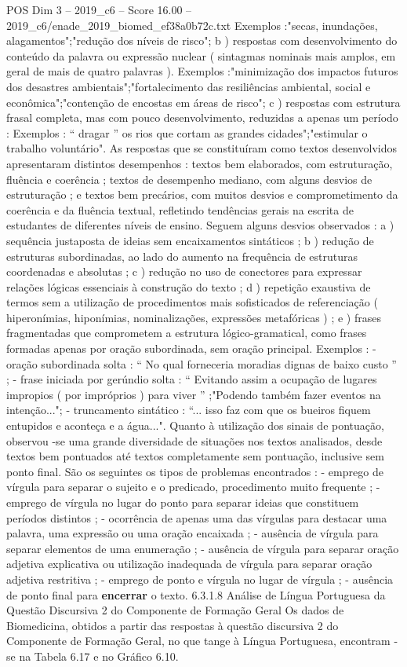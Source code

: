 \begin{textsample}{POS Dim 3 – 2019\_c6 – Score 16.00 – 2019\_c6/enade\_2019\_biomed\_ef38a0b72c.txt}
Exemplos :"secas, inundações, alagamentos";"redução dos níveis de risco"; b ) respostas com desenvolvimento do conteúdo da palavra ou expressão nuclear ( sintagmas nominais mais amplos, em geral de mais de quatro palavras ).
Exemplos :"minimização dos impactos futuros dos desastres ambientais";"fortalecimento das resiliências ambiental, social e econômica";"contenção de encostas em áreas de risco"; c ) respostas com estrutura frasal completa, mas com pouco desenvolvimento, reduzidas a apenas um período : Exemplos : “ dragar ” os rios que cortam as grandes cidades";"estimular o trabalho voluntário".
As respostas que se constituíram como textos desenvolvidos apresentaram distintos desempenhos : textos bem elaborados, com estruturação, fluência e coerência ; textos de desempenho mediano, com alguns desvios de estruturação ; e textos bem precários, com muitos desvios e comprometimento da coerência e da fluência textual, refletindo tendências gerais na escrita de estudantes de diferentes níveis de ensino.
Seguem alguns desvios observados : a ) sequência justaposta de ideias sem encaixamentos sintáticos ; b ) redução de estruturas subordinadas, ao lado do aumento na frequência de estruturas coordenadas e absolutas ; c ) redução no uso de conectores para expressar relações lógicas essenciais à construção do texto ; d ) repetição exaustiva de termos sem a utilização de procedimentos mais sofisticados de referenciação ( hiperonímias, hiponímias, nominalizações, expressões metafóricas ) ; e ) frases fragmentadas que comprometem a estrutura lógico-gramatical, como frases formadas apenas por oração subordinada, sem oração principal.
Exemplos : - oração subordinada solta : “ No qual forneceria moradias dignas de baixo custo ” ; - frase iniciada por gerúndio solta : “ Evitando assim a ocupação de lugares impropios ( por impróprios ) para viver ” ;"Podendo também fazer eventos na intenção..."; - truncamento sintático : “... isso faz com que os bueiros fiquem entupidos e aconteça e a água...".
Quanto à utilização dos sinais de pontuação, observou -se uma grande diversidade de situações nos textos analisados, desde textos bem pontuados até textos completamente sem pontuação, inclusive sem ponto final.
São os seguintes os tipos de problemas encontrados : - emprego de vírgula para separar o sujeito e o predicado, procedimento muito frequente ; - emprego de vírgula no lugar do ponto para separar ideias que constituem períodos distintos ; - ocorrência de apenas uma das vírgulas para destacar uma palavra, uma expressão ou uma oração encaixada ; - ausência de vírgula para separar elementos de uma enumeração ; - ausência de vírgula para separar oração adjetiva explicativa ou utilização inadequada de vírgula para separar oração adjetiva restritiva ; - emprego de ponto e vírgula no lugar de vírgula ; - ausência de ponto final para \textbf{encerrar} o texto. 6.3.1.8 Análise de Língua Portuguesa da Questão Discursiva 2 do Componente de Formação Geral Os dados de Biomedicina, obtidos a partir das respostas à questão discursiva 2 do Componente de Formação Geral, no que tange à Língua Portuguesa, encontram -se na Tabela 6.17 e no Gráfico 6.10.

\end{textsample}
